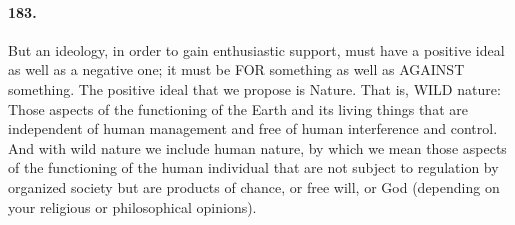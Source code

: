 \documentclass[12pt]{book}
\begin{document}
\paragraph{183.}  But an ideology, in order to gain enthusiastic support, must have a positive ideal as well as a negative one; it must be FOR something as well as AGAINST something. The positive ideal that we propose is Nature.  That is, WILD nature: Those aspects of the functioning of the Earth and its living things that are independent of human management and free of human interference and control. And with wild nature we include human nature, by which we mean those aspects of the functioning of the human individual that are not subject to regulation by organized society but are products of chance, or free will, or God (depending on your religious or philosophical opinions).
\end{document}
